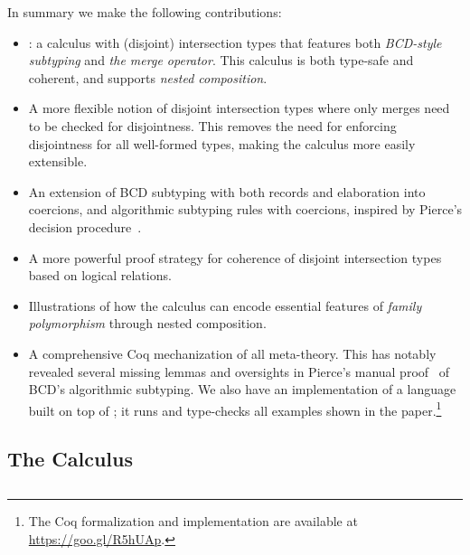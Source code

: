 In summary we make the following contributions:
\begin{itemize}

\item \namee: a calculus with (disjoint) intersection types
that features both \emph{BCD-style subtyping} and \emph{the merge operator}.
This calculus is both type-safe and coherent, and supports \emph{nested
composition}.

\item A more flexible notion of disjoint intersection types where
only merges need to be checked for disjointness. This removes the need
for enforcing disjointness for all well-formed types, making the
calculus more easily extensible.

\item An extension of BCD subtyping with both records and elaboration into coercions,
  and
  algorithmic subtyping rules with coercions, inspired by
  Pierce's decision
  procedure~\citep{pierce1989decision}.

\item A more powerful proof strategy for coherence of disjoint
  intersection types based on logical
  relations.

\item Illustrations of how the calculus can encode essential features
of \emph{family polymorphism} through nested composition.

\item A comprehensive Coq mechanization of all meta-theory. This has notably revealed
  several missing lemmas and oversights
  in Pierce's manual proof~\citep{pierce1989decision} of BCD's algorithmic
  subtyping. %
  We also have an implementation of a language built on top of \name; it runs and type-checks all examples shown in
  the paper.\footnote{The Coq formalization and implementation are available at \url{https://goo.gl/R5hUAp}.}


\end{itemize}



\subsection{The \fnamee Calculus}



\subsection{\sedel}

